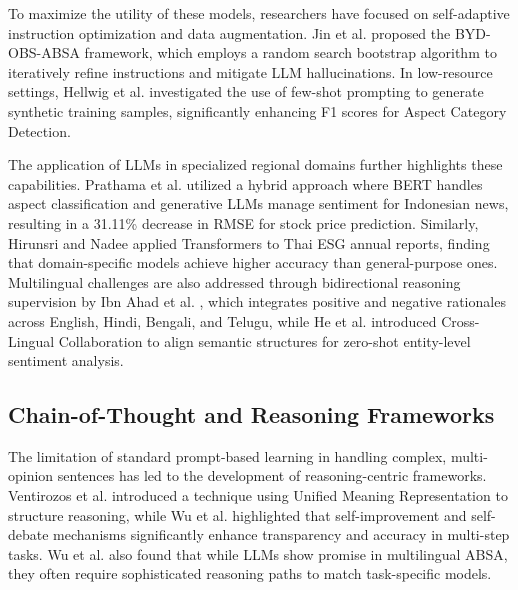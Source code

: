 \documentclass[english, online, cse, master]{dithesis}
\begin{document}
To maximize the utility of these models, researchers have focused on self-adaptive instruction optimization and data augmentation. Jin et al.  \parencite{weiqiang_jin_5ccfa531} proposed the BYD-OBS-ABSA framework, which employs a random search bootstrap algorithm to iteratively refine instructions and mitigate LLM hallucinations. In low-resource settings, Hellwig et al.  \parencite{nils_constantin_hellwig_6fa4e097} investigated the use of few-shot prompting to generate synthetic training samples, significantly enhancing F1 scores for Aspect Category Detection.

The application of LLMs in specialized regional domains further highlights these capabilities. Prathama et al.  \parencite{ubaidillah_ariq_prathama_a1856e2f} utilized a hybrid approach where BERT handles aspect classification and generative LLMs manage sentiment for Indonesian news, resulting in a 31.11\% decrease in RMSE for stock price prediction. Similarly, Hirunsri and Nadee  \parencite{tharnsaithong_hirunsri_e4c4d75b} applied Transformers to Thai ESG annual reports, finding that domain-specific models achieve higher accuracy than general-purpose ones. Multilingual challenges are also addressed through bidirectional reasoning supervision by Ibn Ahad et al.  \parencite{association_for_computational_linguistics_2025_1ba46dee}, which integrates positive and negative rationales across English, Hindi, Bengali, and Telugu, while He et al.  \parencite{association_for_computational_linguistics_2025_5a25f994} introduced Cross-Lingual Collaboration to align semantic structures for zero-shot entity-level sentiment analysis.
\subsection{Chain-of-Thought and Reasoning Frameworks}

The limitation of standard prompt-based learning in handling complex, multi-opinion sentences has led to the development of reasoning-centric frameworks. Ventirozos et al.  \parencite{filippos_ventirozos_5976f1ad} introduced a technique using Unified Meaning Representation to structure reasoning, while Wu et al.  \parencite{chengyan_wu_4c659eab} highlighted that self-improvement and self-debate mechanisms significantly enhance transparency and accuracy in multi-step tasks. Wu et al.  \parencite{chengyan_wu_4c659eab} also found that while LLMs show promise in multilingual ABSA, they often require sophisticated reasoning paths to match task-specific models.
\end{document}
